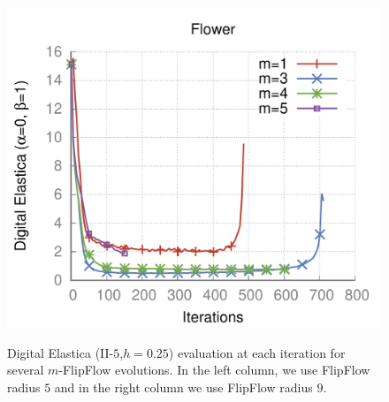 \begin{figure}
{\includegraphics[scale=0.5]{figures/chapter6/level-effect/flower/improve/len_pen0/radius-5/level1/level-effect.pdf}}%
%
\caption{Digital Elastica (II-$5$,$h=0.25$) evaluation at each iteration for several $m$-FlipFlow evolutions. In the left column, we use FlipFlow radius $5$ and in the right column we use FlipFlow radius $9$. }
\label{fig:mrings-plots-r5-r9}
\end{figure}

